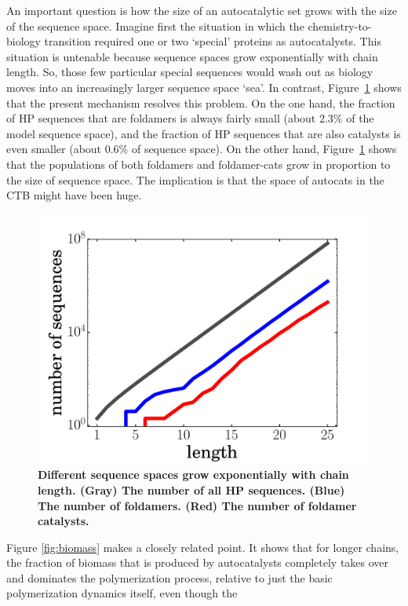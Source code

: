\documentclass[twocolumn,letterpaper]{revtex4}
\begin{document}
 An important question is how the size of an autocatalytic set grows with the size of the sequence 
space.  Imagine first the situation in which the chemistry-to-biology transition required one or 
two `special' proteins as autocatalysts.  This situation is untenable because sequence spaces grow 
exponentially with chain length.  So, those few particular special sequences would wash out as 
biology moves into an increasingly larger sequence space `sea'.  In contrast, 
Figure~\ref{fig:hp-statistics} shows that the present mechanism resolves this problem.  On the one 
hand, the fraction of HP sequences that are foldamers is always fairly small (about 2.3\% of the 
model sequence space), and the fraction of HP sequences that are also catalysts is even smaller 
(about 0.6\% of sequence space).  On the other hand, Figure~\ref{fig:hp-statistics} shows that the 
populations of both foldamers and foldamer-cats grow in proportion to the size of sequence space.  
The implication is that the space of autocats in the CTB might have been huge.
\begin{figure}[hbt!]
  \centering
  \includegraphics[width=0.9\columnwidth]{pictures/hp-statistics.pdf} 
  \caption{\footnotesize{\bf{Different sequence spaces grow exponentially with chain length.}  
(Gray) The number of all HP sequences.  (Blue) The number of foldamers.  (Red) The number of 
foldamer catalysts.}}
  \label{fig:hp-statistics}
\end{figure}
 Figure \ref{fig:biomass} makes a closely related point.  It shows that for longer chains, the 
fraction of biomass that is produced by autocatalysts completely takes over and dominates the 
polymerization process, relative to just the basic polymerization dynamics itself, even though the 
\end{document}
